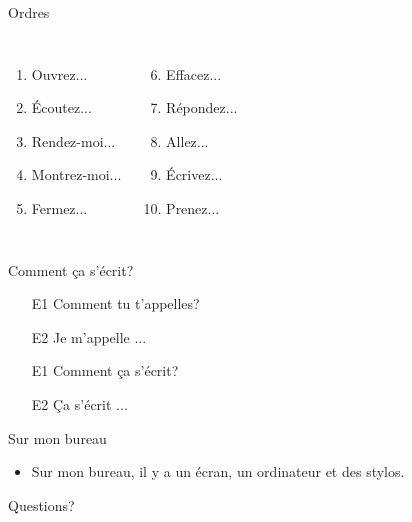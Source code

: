 \documentclass{beamer}
\begin{document}
  \begin{frame}{Ordres }
    \begin{columns}
        \begin{enumerate}
          \item Ouvrez...
          \item Écoutez...
          \item Rendez-moi...
          \item Montrez-moi...
          \item Fermez...
        \end{enumerate}
        \begin{enumerate}
          \setcounter{enumi}{5}
          \item Effacez...
          \item Répondez...
          \item Allez...
          \item Écrivez...
          \item Prenez...
        \end{enumerate}
    \end{columns}
  \end{frame}

  \begin{frame}{Comment ça s'écrit? }
    \begin{itemize}
      \item[E1] Comment tu t'appelles?
      \item[E2] Je m'appelle ...
      \item[E1] Comment ça s'écrit?
      \item[E2] Ça s'écrit ...
    \end{itemize}
  \end{frame}

  \begin{frame}{Sur mon bureau }
    \begin{itemize}
      \item Sur mon bureau, il y a un écran, un ordinateur et des stylos.
    \end{itemize}
  \end{frame}

  \begin{frame}{}
    \begin{center}
      \Large Questions?
    \end{center}
  \end{frame}
\end{document}
